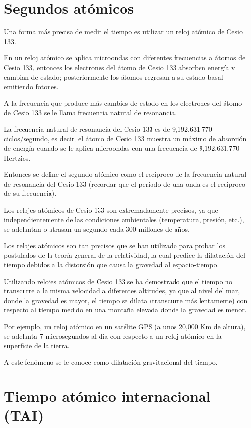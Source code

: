 \section{Segundos atómicos}

Una forma más precisa de medir el tiempo es utilizar un reloj atómico de Cesio 133.

En un reloj atómico se aplica microondas con diferentes frecuencias a átomos de Cesio 133, entonces los electrones del átomo de Cesio 133 absorben energía y cambian de estado; posteriormente los átomos regresan a su estado basal emitiendo fotones.

A la frecuencia que produce más cambios de estado en los electrones del átomo de Cesio 133 se le llama frecuencia natural de resonancia.

La frecuencia natural de resonancia del Cesio 133 es de 9,192,631,770 ciclos/segundo, es decir, el átomo de Cesio 133 muestra un máximo de absorción de energía cuando se le aplica microondas con una frecuencia de 9,192,631,770 Hertzios.

Entonces se define el segundo atómico como el recíproco de la frecuencia natural de resonancia del Cesio 133 (recordar que el periodo de una onda es el recíproco de su frecuencia).

Los relojes atómicos de Cesio 133 son extremadamente precisos, ya que independientemente de las condiciones ambientales (temperatura, presión, etc.), se adelantan o atrasan un segundo cada 300 millones de años.

Los relojes atómicos son tan precisos que se han utilizado para probar los postulados de la teoría general de la relatividad, la cual predice la dilatación del tiempo debidos a la distorsión que causa la gravedad al espacio-tiempo.

Utilizando relojes atómicos de Cesio 133 se ha demostrado que el tiempo no transcurre a la misma velocidad a diferentes altitudes, ya que al nivel del mar, donde la gravedad es mayor, el tiempo se dilata (transcurre más lentamente) con respecto al tiempo medido en una montaña elevada donde la gravedad es menor.

Por ejemplo, un reloj atómico en un satélite GPS (a unos 20,000 Km de altura), se adelanta 7 microsegundos al día con respecto a un reloj atómico en la superficie de la tierra.

A este fenómeno se le conoce como dilatación gravitacional del tiempo.

\section{Tiempo atómico internacional (TAI)}

